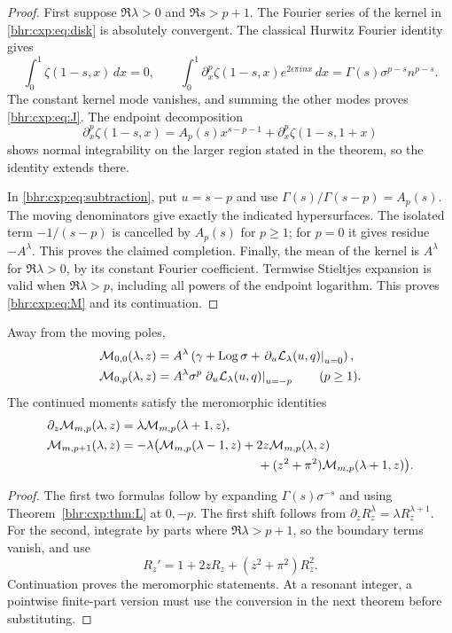 \begin{proof}
First suppose \(\Re\lambda>0\) and \(\Re s>p+1\).
The Fourier series of the kernel in \eqref{bhr:cxp:eq:disk}
is absolutely convergent.  The classical Hurwitz Fourier identity
\cite[25.11.9]{bhr:DLMFZ} gives
\[
 \int_0^1\zeta(1-s,x)\,dx=0,\qquad
 \int_0^1\partial_x^p\zeta(1-s,x)
           e^{2\epsilon\pi i n x}\,dx
 =\Gamma(s)\sigma^{p-s}n^{p-s}.
\]
The constant kernel mode vanishes, and summing the other modes
proves \eqref{bhr:cxp:eq:J}.  The endpoint decomposition
\[
 \partial_x^p\zeta(1-s,x)
 =A_p(s)x^{s-p-1}
       +\partial_x^p\zeta(1-s,1+x)
\]
shows normal integrability on the larger region stated in the
theorem, so the identity extends there.

In \eqref{bhr:cxp:eq:subtraction}, put \(u=s-p\) and use
\(\Gamma(s)/\Gamma(s-p)=A_p(s)\).  The moving denominators
give exactly the indicated hypersurfaces.  The isolated term
\(-1/(s-p)\) is cancelled by \(A_p(s)\) for \(p\ge1\); for
\(p=0\) it gives residue \(-A^\lambda\).  This proves the
claimed completion.  Finally, the mean of the kernel is \(A^\lambda\)
for \(\Re\lambda>0\), by its constant Fourier coefficient.
Termwise Stieltjes expansion is valid when \(\Re\lambda>p\),
including all powers of the endpoint logarithm.  This proves
\eqref{bhr:cxp:eq:M} and its continuation.
\end{proof}

\begin{corollary}
\label{bhr:cxp:cor:shifts}
Away from the moving poles,
\begin{align*}
 \mathcal M_{0,0}(\lambda,z)
 &=A^\lambda\left(
   \gamma+\operatorname{Log}\sigma+
         \left.\partial_u\mathcal L_\lambda(u,q)\right|_{u=0}\right),\\
 \mathcal M_{0,p}(\lambda,z)
 &=A^\lambda\sigma^p
         \left.\partial_u\mathcal L_\lambda(u,q)\right|_{u=-p}
                                      \qquad(p\ge1).
\end{align*}
The continued moments satisfy the meromorphic identities
\begin{align}
 \partial_z\mathcal M_{m,p}(\lambda,z)
   &=\lambda\mathcal M_{m,p}(\lambda+1,z),\label{bhr:cxp:eq:zshift}\\
 \mathcal M_{m,p+1}(\lambda,z)
   &=-\lambda\bigl(
       \mathcal M_{m,p}(\lambda-1,z)
       +2z\mathcal M_{m,p}(\lambda,z)\notag\\
   &\hspace{39mm}
       +(z^2+\pi^2)\mathcal M_{m,p}(\lambda+1,z)\bigr).
       \label{bhr:cxp:eq:pshift}
\end{align}
\end{corollary}
\begin{proof}
The first two formulas follow by expanding \(\Gamma(s)\sigma^{-s}\)
and using Theorem~\ref{bhr:cxp:thm:L} at \(0,-p\).
The first shift follows from
\(\partial_zR_z^\lambda=\lambda R_z^{\lambda+1}\).
For the second, integrate by parts where \(\Re\lambda>p+1\),
so the boundary terms vanish, and use
\[
 R_z'=1+2zR_z+(z^2+\pi^2)R_z^2.
\]
Continuation proves the meromorphic statements.  At a resonant
integer, a pointwise finite-part version must use the conversion
in the next theorem before substituting.
\end{proof}

